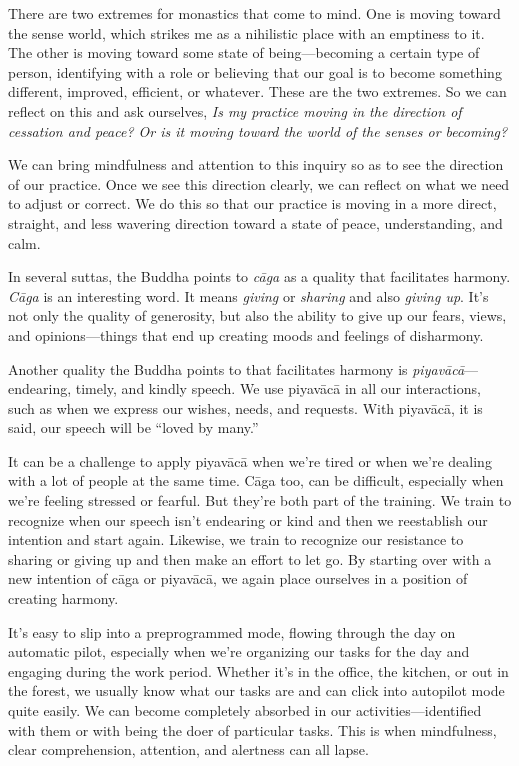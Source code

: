 There are two extremes for monastics that come to mind. One is moving 
toward the sense world, which strikes me as a nihilistic place with an 
emptiness to it. The other is moving toward some state of 
being---becoming a certain type of person, identifying with a role or 
believing that our goal is to become something different, improved, 
efficient, or whatever. These are the two extremes. So we can reflect 
on this and ask ourselves, \emph{Is my practice moving in the direction 
of cessation and peace? Or is it moving toward the world of the senses 
or becoming?}

We can bring mindfulness and attention to this inquiry so as to see the 
direction of our practice. Once we see this direction clearly, we can 
reflect on what we need to adjust or correct. We do this so that our 
practice is moving in a more direct, straight, and less wavering 
direction toward a state of peace, understanding, and calm.


In several suttas, the Buddha points to \emph{cāga} as a quality that 
facilitates harmony. \emph{Cāga} is an interesting word. It means 
\emph{giving} or \emph{sharing} and also \emph{giving up}. It's not 
only the quality of generosity, but also the ability to give up our 
fears, views, and opinions---things that end up creating moods and 
feelings of disharmony.

Another quality the Buddha points to that facilitates harmony is 
\emph{piyavācā}---endearing, timely, and kindly speech. We use 
piyavācā in all our interactions, such as when we express our wishes, 
needs, and requests. With piyavācā, it is said, our speech will be 
``loved by many.''

It can be a challenge to apply piyavācā when we're tired or when 
we're dealing with a lot of people at the same time. Cāga too, can be 
difficult, especially when we're feeling stressed or fearful. But 
they're both part of the training. We train to recognize when our 
speech isn't endearing or kind and then we reestablish our intention 
and start again. Likewise, we train to recognize our resistance to 
sharing or giving up and then make an effort to let go. By starting 
over with a new intention of cāga or piyavācā, we again place 
ourselves in a position of creating harmony.


It's easy to slip into a preprogrammed mode, flowing through the day on 
automatic pilot, especially when we're organizing our tasks for the day 
and engaging during the work period. Whether it's in the office, the 
kitchen, or out in the forest, we usually know what our tasks are and 
can click into autopilot mode quite easily. We can become completely 
absorbed in our activities---identified with them or with being the 
doer of particular tasks. This is when mindfulness, clear 
comprehension, attention, and alertness can all lapse.

